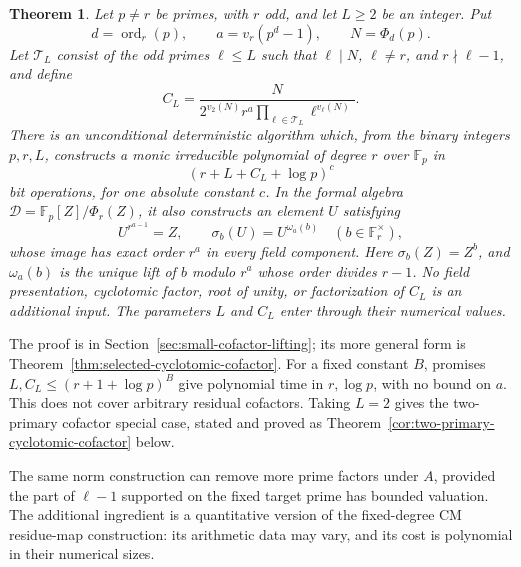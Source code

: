 \documentclass[11pt]{article}
\newtheorem{theorem}{Theorem}[section]
\theoremstyle{definition}
\theoremstyle{remark}
\begin{document}
\begin{theorem}\label{thm:threshold-cyclotomic-cofactor}
Let \(p\ne r\) be primes, with \(r\) odd, and let \(L\ge2\) be
an integer. Put
\[
 d=\operatorname{ord}_r(p),\qquad a=v_r(p^d-1),\qquad N=\Phi_d(p).
\]
Let \(\mathcal T_L\) consist of the odd primes \(\ell\le L\)
such that \(\ell\mid N\), \(\ell\ne r\), and
\(r\nmid\ell-1\), and define
\[
 C_L=\frac{N}{2^{v_2(N)}r^a
                   \prod_{\ell\in\mathcal T_L}\ell^{v_\ell(N)}}.
\]
There is an unconditional deterministic algorithm which, from the
binary integers \(p,r,L\), constructs a monic irreducible polynomial
of degree \(r\) over \(\mathbb F_p\) in
\[
                    (r+L+C_L+\log p)^c
\]
bit operations, for one absolute constant \(c\).
In the formal algebra \(\mathcal D=\mathbb F_p[Z]/\Phi_r(Z)\),
it also constructs an element \(U\) satisfying
\[
 U^{r^{a-1}}=Z,\qquad
 \sigma_b(U)=U^{\omega_a(b)}\quad(b\in\mathbb F_r^\times),
\]
whose image has exact order \(r^a\) in every field component.
Here \(\sigma_b(Z)=Z^b\), and \(\omega_a(b)\) is the unique lift
of \(b\) modulo \(r^a\) whose order divides \(r-1\).
No field presentation, cyclotomic factor, root of unity, or
factorization of \(C_L\) is an additional input. The parameters
\(L\) and \(C_L\) enter through their numerical values.
\end{theorem}

The proof is in Section~\ref{sec:small-cofactor-lifting}; its more
general form is Theorem~\ref{thm:selected-cyclotomic-cofactor}.
For a fixed constant \(B\), promises
\(L,C_L\le(r+1+\log p)^B\) give polynomial time in
\(r,\log p\), with no bound on \(a\). This does not cover
arbitrary residual cofactors. Taking \(L=2\) gives the
two-primary cofactor special case, stated and proved as
Theorem~\ref{cor:two-primary-cyclotomic-cofactor} below.

The same norm construction can remove more prime factors under \(A\),
provided the part of \(\ell-1\) supported on the fixed target prime has
bounded valuation. The additional ingredient is a quantitative version of
the fixed-degree CM residue-map construction: its arithmetic data may vary,
and its cost is polynomial in their numerical sizes.
\end{document}
